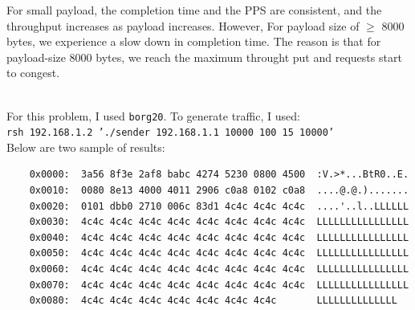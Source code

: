 \documentclass[12pt]{article}
\newenvironment{problem}[2][Problem]{\begin{trivlist}
\item[\hskip \labelsep {\bfseries #1}\hskip \labelsep {\bfseries #2.}]}{\end{trivlist}}
\begin{document}
\begin{problem}{2}
\begin{center}
\end{center}
For small payload, the completion time and the PPS are consistent, and the throughput increases as payload increases. However, For payload size of $\geq$ 8000 bytes, we experience a slow down in completion time. The reason is that for payload-size 8000 bytes, we reach the maximum throught put and requests start to congest.
\end{problem}
\begin{problem}{3} \ \\
For this problem, I used \texttt{borg20}.
To generate traffic, I used: \\
\texttt{rsh 192.168.1.2 './sender 192.168.1.1 10000 100 15 10000'}
\\
Below are two sample of results:
\begin{verbatim}
	0x0000:  3a56 8f3e 2af8 babc 4274 5230 0800 4500  :V.>*...BtR0..E.
	0x0010:  0080 8e13 4000 4011 2906 c0a8 0102 c0a8  ....@.@.).......
	0x0020:  0101 dbb0 2710 006c 83d1 4c4c 4c4c 4c4c  ....'..l..LLLLLL
	0x0030:  4c4c 4c4c 4c4c 4c4c 4c4c 4c4c 4c4c 4c4c  LLLLLLLLLLLLLLLL
	0x0040:  4c4c 4c4c 4c4c 4c4c 4c4c 4c4c 4c4c 4c4c  LLLLLLLLLLLLLLLL
	0x0050:  4c4c 4c4c 4c4c 4c4c 4c4c 4c4c 4c4c 4c4c  LLLLLLLLLLLLLLLL
	0x0060:  4c4c 4c4c 4c4c 4c4c 4c4c 4c4c 4c4c 4c4c  LLLLLLLLLLLLLLLL
	0x0070:  4c4c 4c4c 4c4c 4c4c 4c4c 4c4c 4c4c 4c4c  LLLLLLLLLLLLLLLL
	0x0080:  4c4c 4c4c 4c4c 4c4c 4c4c 4c4c 4c4c       LLLLLLLLLLLLLL
\end{verbatim}


\end{problem}
\end{document}
